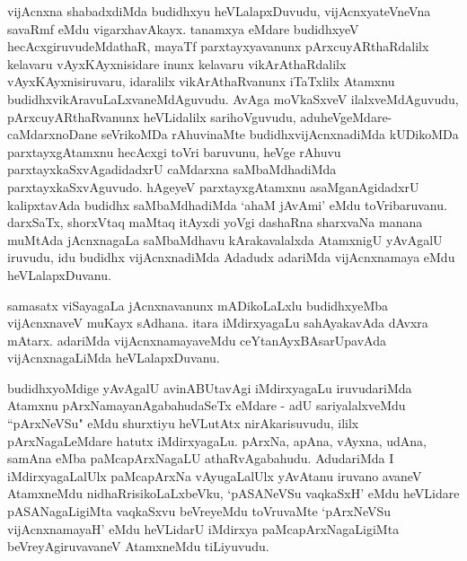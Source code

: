 \begin{artha}
vijAcnxna shabadxdiMda budidhxyu heVLalapxDuvudu, vijAcnxyateV\s neVna savaRmf eMdu vigarxhavAkayx. tanamxya eMdare budidhxyeV hecAcxgiruvudeMdathaR, mayaTf parxtayxyavanunx pArxcuyARthaRdalilx kelavaru vAyxKAyxnisidare inunx kelavaru vikArAthaRdalilx vAyxKAyxnisiruvaru, idaralilx vikArAthaRvanunx iTaTxlilx Atamxnu budidhxvikAravuLaLxvaneMdAguvudu. AvAga moVkaSxveV ilalxveMdAguvudu, pArxcuyARthaRvanunx heVLidalilx sarihoVguvudu, aduheVgeMdare-caMdarxnoDane seVrikoMDa rAhuvinaMte budidhxvijAcnxnadiMda kUDikoMDa parxtayxgAtamxnu hecAcxgi toVri baruvunu, heVge rAhuvu parxtayxkaSxvAgadidadxrU caMdarxna saMbaMdhadiMda parxtayxkaSxvAguvudo. hAgeyeV parxtayxgAtamxnu asaMganAgidadxrU kalipxtavAda budidhx saMbaMdhadiMda `ahaM jAvAmi' eMdu toVribaruvanu. darxSaTx, shorxVtaq maMtaq itAyxdi yoVgi dashaRna sharxvaNa manana muMtAda jAcnxnagaLa saMbaMdhavu kArakavalalxda AtamxnigU yAvAgalU iruvudu, idu budidhx vijAcnxnadiMda Adadudx adariMda vijAcnxnamaya eMdu heVLalapxDuvanu. 
\end{artha}

\begin{artha}
samasatx viSayagaLa jAcnxnavanunx mADikoLaLxlu budidhxyeMba vijAcnxnaveV muKayx sAdhana. itara iMdirxyagaLu sahAyakavAda dAvxra mAtarx. adariMda vijAcnxnamayaveMdu ceYtanAyxBAsarUpavAda vijAcnxnagaLiMda heVLalapxDuvanu.
\end{artha}


\begin{artha}
budidhxyoMdige yAvAgalU avinABUtavAgi iMdirxyagaLu iruvudariMda Atamxnu pArxNamayanAgabahudaSeTx eMdare - adU sariyalalxveMdu ``pArxNeVSu" eMdu shurxtiyu heVLutAtx nirAkarisuvudu, ililx pArxNagaLeMdare hatutx iMdirxyagaLu. pArxNa, apAna, vAyxna, udAna, samAna eMba paMcapArxNagaLU athaRvAgabahudu. AdudariMda I iMdirxyagaLalUlx paMcapArxNa vAyugaLalUlx yAvAtanu iruvano avaneV AtamxneMdu nidhaRrisikoLaLxbeVku, `pASANeVSu vaqkaSxH' eMdu heVLidare pASANagaLigiMta vaqkaSxvu beVreyeMdu toVruvaMte `pArxNeVSu vijAcnxnamayaH' eMdu heVLidarU iMdirxya paMcapArxNagaLigiMta beVreyAgiruvavaneV AtamxneMdu tiLiyuvudu. 
\end{artha}%


